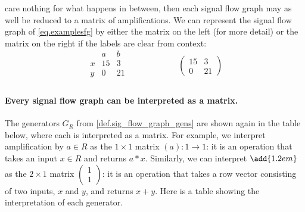 \documentclass[7Sketches]{subfiles}
\begin{document}
care nothing for what happens in between, then each signal flow graph may as
well be reduced to a matrix of amplifications. We can represent the signal flow graph of \cref{eq.examplesfg} by either the matrix on the left (for more detail) or the matrix on the right if the labels are clear from context:
\[
  \begin{array}{c|cc}
    &a&b\\\hline
    x & 15 & 3\\
    y & 0 & 21\\
  \end{array}
\hspace{1in}
  \begin{pmatrix}
    15 & 3 \\ 
    0 & 21
  \end{pmatrix}
\]

\paragraph{Every signal flow graph can be interpreted as a matrix.}

The generators $G_R$ from \cref{def.sig_flow_graph_gens} are shown again in the table below, where each is interpreted as a matrix. For example, we interpret amplification by $a \in R$ as the
$1\times 1$ matrix $(a)\colon 1 \to 1$: it is an operation that takes an input
$x\in R$ and returns $a*x$.  Similarly, we can interpret $\add{1.2em}$ as the $2\times 1$ matrix $\left(\begin{smallmatrix} 1\\1\end{smallmatrix}\right)$: it is an operation that takes a row vector consisting of two
inputs, $x$ and $y$, and returns $x+y$.  Here is a table showing the
interpretation of each generator.%
\end{document}
